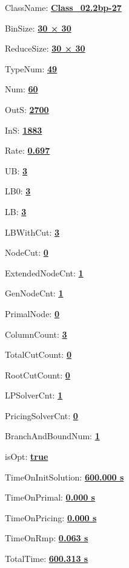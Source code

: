 \documentclass[11pt]{article}
\begin{document}
\pagestyle{empty}


ClassName: \underline{\textbf{Class_02.2bp-27}}
\par
BinSize: \underline{\textbf{30 × 30}}
\par
ReduceSize: \underline{\textbf{30 × 30}}
\par
TypeNum: \underline{\textbf{49}}
\par
Num: \underline{\textbf{60}}
\par
OutS: \underline{\textbf{2700}}
\par
InS: \underline{\textbf{1883}}
\par
Rate: \underline{\textbf{0.697}}
\par
UB: \underline{\textbf{3}}
\par
LB0: \underline{\textbf{3}}
\par
LB: \underline{\textbf{3}}
\par
LBWithCut: \underline{\textbf{3}}
\par
NodeCut: \underline{\textbf{0}}
\par
ExtendedNodeCnt: \underline{\textbf{1}}
\par
GenNodeCnt: \underline{\textbf{1}}
\par
PrimalNode: \underline{\textbf{0}}
\par
ColumnCount: \underline{\textbf{3}}
\par
TotalCutCount: \underline{\textbf{0}}
\par
RootCutCount: \underline{\textbf{0}}
\par
LPSolverCnt: \underline{\textbf{1}}
\par
PricingSolverCnt: \underline{\textbf{0}}
\par
BranchAndBoundNum: \underline{\textbf{1}}
\par
isOpt: \underline{\textbf{true}}
\par
TimeOnInitSolution: \underline{\textbf{600.000 s}}
\par
TimeOnPrimal: \underline{\textbf{0.000 s}}
\par
TimeOnPricing: \underline{\textbf{0.000 s}}
\par
TimeOnRmp: \underline{\textbf{0.063 s}}
\par
TotalTime: \underline{\textbf{600.313 s}}
\par
\newpage
\end{document}
